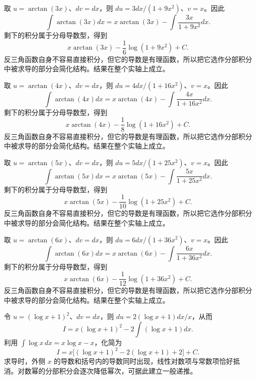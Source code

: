 \documentclass[12pt,fontset=fandol]{ctexart}
\begin{document}
\begin{solve}\label{ans:c15q9}
取 $u=\arctan(3x)$、$dv=dx$，则 $du=3dx/(1+9x^2)$、$v=x$。因此
\[
\int\arctan(3x)dx=x\arctan(3x)-\int\frac{3x}{1+9x^2}dx.
\]
剩下的积分属于分母导数型，得到
\[
x\arctan(3x)-\frac{1}{6}\log(1+9x^2)+C.
\]
反三角函数自身不容易直接积分，但它的导数是有理函数，所以把它选作分部积分中被求导的部分会简化结构。结果在整个实轴上成立。
\end{solve}

\begin{solve}\label{ans:c15q10}
取 $u=\arctan(4x)$、$dv=dx$，则 $du=4dx/(1+16x^2)$、$v=x$。因此
\[
\int\arctan(4x)dx=x\arctan(4x)-\int\frac{4x}{1+16x^2}dx.
\]
剩下的积分属于分母导数型，得到
\[
x\arctan(4x)-\frac{1}{8}\log(1+16x^2)+C.
\]
反三角函数自身不容易直接积分，但它的导数是有理函数，所以把它选作分部积分中被求导的部分会简化结构。结果在整个实轴上成立。
\end{solve}

\begin{solve}\label{ans:c15q11}
取 $u=\arctan(5x)$、$dv=dx$，则 $du=5dx/(1+25x^2)$、$v=x$。因此
\[
\int\arctan(5x)dx=x\arctan(5x)-\int\frac{5x}{1+25x^2}dx.
\]
剩下的积分属于分母导数型，得到
\[
x\arctan(5x)-\frac{1}{10}\log(1+25x^2)+C.
\]
反三角函数自身不容易直接积分，但它的导数是有理函数，所以把它选作分部积分中被求导的部分会简化结构。结果在整个实轴上成立。
\end{solve}

\begin{solve}\label{ans:c15q12}
取 $u=\arctan(6x)$、$dv=dx$，则 $du=6dx/(1+36x^2)$、$v=x$。因此
\[
\int\arctan(6x)dx=x\arctan(6x)-\int\frac{6x}{1+36x^2}dx.
\]
剩下的积分属于分母导数型，得到
\[
x\arctan(6x)-\frac{1}{12}\log(1+36x^2)+C.
\]
反三角函数自身不容易直接积分，但它的导数是有理函数，所以把它选作分部积分中被求导的部分会简化结构。结果在整个实轴上成立。
\end{solve}

\begin{solve}\label{ans:c15q13}
令 $u=(\log x+1)^2$、$dv=dx$，则 $du=2(\log x+1)dx/x$，从而
\[
I=x(\log x+1)^2-2\int(\log x+1)dx.
\]
利用 $\int\log x\,dx=x\log x-x$，化简为
\[
I=x\bigl[(\log x+1)^2-2(\log x+1)+2\bigr]+C.
\]
求导时，外侧 $x$ 的导数和括号内的导数同时出现，线性对数项与常数项恰好抵消。对数幂的分部积分会逐次降低幂次，可据此建立一般递推。
\end{solve}
\end{document}
